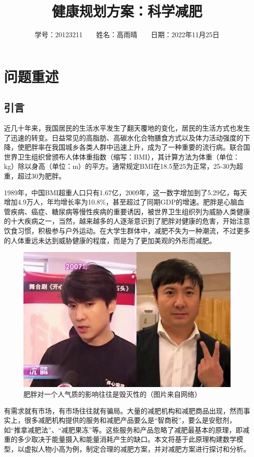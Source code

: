 \documentclass[a4paper,12pt,onecolumn,twoside]{article}
\title{健康规划方案：科学减肥}
\author{学号：20123211~~~~姓名：高雨晴~~~~日期：2022年11月25日}
\date{}
\begin{document}
\maketitle
\tableofcontents
\section{问题重述}
\subsection{引言}
近几十年来，我国居民的生活水平发生了翻天覆地的变化，居民的生活方式也发生了迅速的转变。日益常见的高脂肪、高碳水化合物膳食方式以及体力活动强度的下降，使肥胖率在我国城乡各类人群中迅速上升，成为了一种重要的流行病。联合国世界卫生组织曾颁布人体体重指数（缩写：BMI），其计算方法为体重（单位：kg）除以身高（单位：m）的平方。通常规定BMI在18.5至25为正常，25-30为超重，超过30为肥胖。\par
1989年，中国BMI超重人口只有1.67亿，2009年，这一数字增加到了5.29亿，每天增加4.9万人，年均增长率为10.8\%，甚至超过了同期GDP的增速\cite{niguohua}。肥胖是心脑血管疾病、癌症、糖尿病等慢性疾病的重要诱因，被世界卫生组织列为威胁人类健康的十大疾病之一，当然，越来越多的人逐渐意识到了肥胖对健康的危害，开始注意饮食习惯，积极参与户外运动。在大学生群体中，减肥不失为一种潮流，不过更多的人体重远未达到威胁健康的程度，而是为了更加美观的外形而减肥。\par
\begin{figure}[H]
	\centering
	\includegraphics[width=0.8\linewidth]{res/shenteng.jpg}
	\caption{肥胖对一个人气质的影响往往是毁灭性的（图片来自网络）}
\end{figure}
有需求就有市场，有市场往往就有骗局。大量的减肥机构和减肥商品出现，然而事实上，很多减肥机构提供的服务和减肥产品要么是“智商税”，要么是安慰剂，如“推拿减肥法”、“减肥果冻”等。这些服务和产品忽略了减肥最基本的原理，即减重的多少取决于能量摄入和能量消耗产生的缺口。本文将基于此原理构建数学模型，以虚拟人物小高为例，制定合理的减肥方案，并对减肥方案进行探讨和分析。
\end{document}
